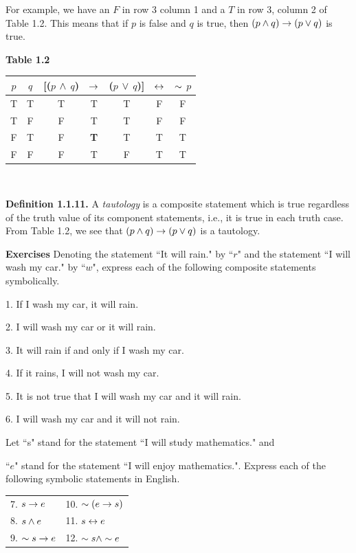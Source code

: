 \begin{large}
For example, we have an $F$ in row 3 column 1 and a $T$ in row 3, column 2 of Table 1.2. This means that if $p$ is false and $q$ is true, then $(p \wedge q ) \to (p \lor q)$ is true.


\newpage
\begin{center}
\textbf{Table 1.2}\nl
\begin{tabular}{ | c | c | c | c | c | c | c |}
\hline
$p$ & $q$ & [($p$ $\wedge$ $q$)& $\to$ & ($p$ $\lor$ $q$)] & $\leftrightarrow$  & $\sim$ $p$ \\ \hline
T & T & T & T & T & F & F\\ \hline
T & F & F & T & T & F & F\\ \hline
F & T & F & \textbf{T} & T & T & T\\ \hline
F & F & F & T & F & T & T\\ \hline
\end{tabular}\nl
$ $\nl
\end{center}

\fl \textbf{Definition 1.1.11.} A \textit{tautology} is a composite statement which is true regardless of the truth value of its component statements, i.e., it is true in each truth case.
From Table 1.2, we see that $(p \wedge q) \to (p \lor q)$ is a tautology. \nl

\fl \textbf{Exercises} \nl
Denoting the statement ``It will rain." by ``$r$" and the statement ``I will wash my car." by ``$w$", express each of the following composite statements symbolically. \nl

1. If I wash my car, it will rain. \nl

2. I will wash my car or it will rain. \nl

3. It will rain if and only if I wash my car. \nl

4. If it rains, I will not wash my car. \nl

5. It is not true that I will wash my car and it will rain. \nl

6. I will wash my car and it will not rain. \nl


Let ``s" stand for the statement ``I will study mathematics." and

``$e$" stand for the statement ``I will enjoy mathematics.". Express each
of the following symbolic statements in English. \nl
\begin{tabular}{ l l}
7. $s \to e$ & 10. $\sim  (e \to s)$ \\
8. $s \wedge e$ & 11.  $s \leftrightarrow e$ \\
9. $\sim s \to e$ & 12. $\sim s \wedge \sim e$ \\
\end{tabular}\nl


\end{large}
